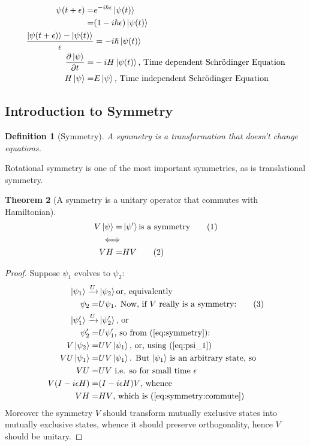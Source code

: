 \documentclass[]{article}
\newcommand\numberthis{\addtocounter{equation}{1}\tag{\theequation}}
\newtheorem{thm}{Theorem}
\newtheorem{defn}[thm]{Definition}
\begin{document}
\begin{align*}
\psi(t+\epsilon) =& e^{-i \hslash \epsilon} \ket{\psi(t)}\\
=& (1- i \hslash \epsilon)\ket{\psi(t)}\\
\frac{\ket{\psi(t+\epsilon)} -\ket{\psi(t)} }{\epsilon}&= -i \hslash \ket{\psi(t)}\\
\frac{\partial \ket{\psi}}{\partial t} =& -i H \ket{\psi(t)} \text{, Time dependent Schr\"odinger Equation}\\
H \ket{\psi} =& E \ket{\psi}\text{, Time independent Schr\"odinger Equation}
\end{align*} 


\subsection{Introduction to Symmetry}

\begin{defn}[Symmetry]
	A symmetry is a transformation that doesn't change equations. 
\end{defn}
Rotational symmetry is one of the most important symmetries, as is translational symmetry.

\begin{thm}[A symmetry is a unitary operator that commutes with Hamiltonian]
	\begin{align*}
	V \ket{\psi} =& \ket{\psi^{\prime}} \text{is a symmetry}\numberthis \label{eq:symmetry}\\
	\iff&\\
	V H =& H V\numberthis \label{eq:symmetry:commute}
	\end{align*}
\end{thm}

\begin{proof}
	Suppose $\psi_1$ evolves to $\psi_2$:
	\begin{align*}
	\ket{\psi_1} \xrightarrow{U}& \ket{\psi_2} \text {or, equivalently}\\
	\psi_2 =& U \psi_1 \text{. Now, if $V$ really is a symmetry:} \numberthis \label{eq:psi_1}\\
	\ket{\psi_1^{\prime}} \xrightarrow{U}& \ket{\psi_2^{\prime}} \text {,  or}\\
	\psi_2^{\prime} =& U \psi_1^{\prime} \text{, so from (\ref{eq:symmetry}):}\\
	V\ket{\psi_2} =& U V \ket{\psi_1} \text{, or, using (\ref{eq:psi_1})}\\
	V U\ket {\psi_1} =& U V \ket{\psi_1} \text{. But $\ket{\psi_1}$ is an arbitrary state, so} \\
	V U =& U V \text{ i.e. so for small time $\epsilon$}\\
	V (I - i \epsilon H) =& (I - i \epsilon H) V \text{, whence}\\
	V H =& H V \text{, which is (\ref{eq:symmetry:commute})}
	\end{align*}
	Moreover the symmetry $V$ should transform mutually exclusive states into mutually exclusive states, whence it should preserve orthogonality, hence $V$ should be unitary. 
\end{proof}
\end{document}
